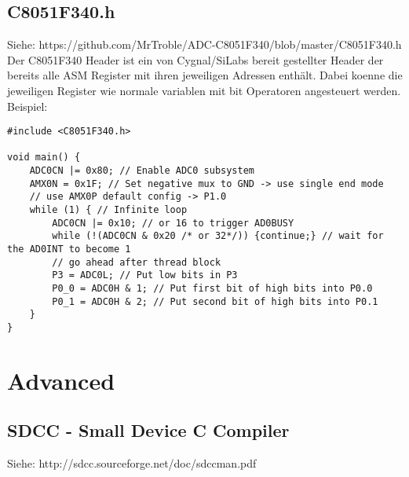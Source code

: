 \documentclass{article}
\begin{document}
\newpage
\subsection{C8051F340.h}
Siehe: https://github.com/MrTroble/ADC-C8051F340/blob/master/C8051F340.h
\newline\newline
Der C8051F340 Header ist ein von Cygnal/SiLabs bereit gestellter Header der bereits alle ASM Register mit ihren jeweiligen Adressen enthält. Dabei koenne die jeweiligen Register wie normale variablen mit bit Operatoren angesteuert werden. Beispiel:
\begin{verbatim}
#include <C8051F340.h>

void main() {
    ADC0CN |= 0x80; // Enable ADC0 subsystem
    AMX0N = 0x1F; // Set negative mux to GND -> use single end mode
    // use AMX0P default config -> P1.0
    while (1) { // Infinite loop
        ADC0CN |= 0x10; // or 16 to trigger AD0BUSY
        while (!(ADC0CN & 0x20 /* or 32*/)) {continue;} // wait for the AD0INT to become 1
        // go ahead after thread block
        P3 = ADC0L; // Put low bits in P3
        P0_0 = ADC0H & 1; // Put first bit of high bits into P0.0
        P0_1 = ADC0H & 2; // Put second bit of high bits into P0.1
    }
}
\end{verbatim}

\section{Advanced}

\subsection{SDCC - Small Device C Compiler}

Siehe: http://sdcc.sourceforge.net/doc/sdccman.pdf
\end{document}
